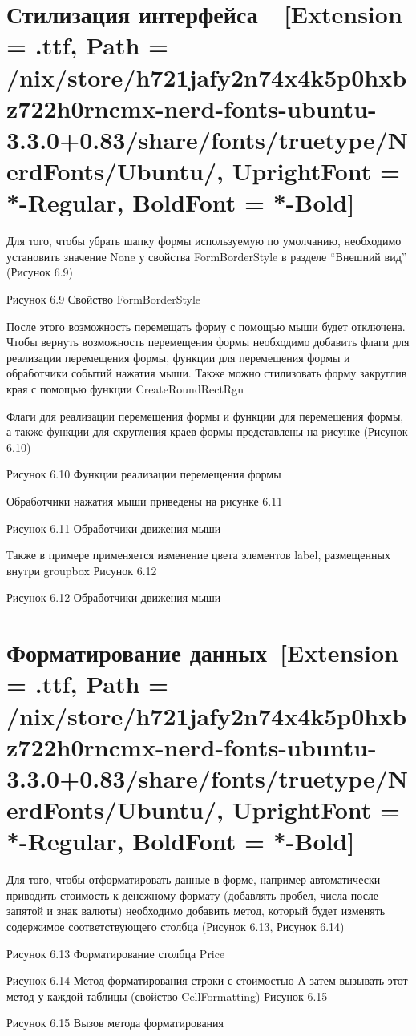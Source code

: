 \documentclass[12pt]{article}
\newcommand{\icon}[1]{\fontspec{UbuntuNerdFont}[Extension = .ttf,
  Path = /nix/store/h721jafy2n74x4k5p0hxbz722h0rncmx-nerd-fonts-ubuntu-3.3.0+0.83/share/fonts/truetype/NerdFonts/Ubuntu/,
  UprightFont = *-Regular,
BoldFont = *-Bold] #1}
\newcommand{\iicon}[1]{{\icon{#1}}}
\renewcommand{\texttt}[1]{{\small\ttfamily #1}}
\numberwithin{listing}{section}
\numberwithin{figure}{section}
\begin{document}
\newpage

\section{Стилизация интерфейса~~\texorpdfstring{\iicon{}}{}}

Для того, чтобы убрать шапку формы используемую по умолчанию, необходимо установить значение \texttt{None} у свойства \texttt{FormBorderStyle} в разделе “Внешний вид” (Рисунок 6.9)

Рисунок 6.9 Свойство FormBorderStyle

После этого возможность перемещать форму с помощью мыши будет отключена. Чтобы вернуть возможность перемещения формы необходимо добавить флаги для реализации перемещения формы, функции для перемещения формы и обработчики событий нажатия мыши. Также можно стилизовать форму закруглив края с помощью функции \texttt{CreateRoundRectRgn}

Флаги для реализации перемещения формы и функции для перемещения формы, а также функции для скругления краев формы представлены на рисунке (Рисунок 6.10)

Рисунок 6.10 Функции реализации перемещения формы

Обработчики нажатия мыши приведены на рисунке 6.11

Рисунок 6.11 Обработчики движения мыши

Также в примере применяется изменение цвета элементов \texttt{label}, размещенных внутри \texttt{groupbox} Рисунок 6.12

Рисунок 6.12 Обработчики движения мыши

\newpage

\section{Форматирование данных~\texorpdfstring{\iicon{}}{}}
Для того, чтобы отформатировать данные в форме, например автоматически приводить стоимость к денежному формату (добавлять пробел, числа после запятой и знак валюты) необходимо добавить метод, который будет изменять содержимое соответствующего столбца (Рисунок 6.13, Рисунок 6.14)

Рисунок 6.13 Форматирование столбца \texttt{Price}

Рисунок 6.14 Метод форматирования строки с стоимостью
А затем вызывать этот метод у каждой таблицы (свойство \texttt{CellFormatting}) Рисунок 6.15

Рисунок 6.15 Вызов метода форматирования
\end{document}
